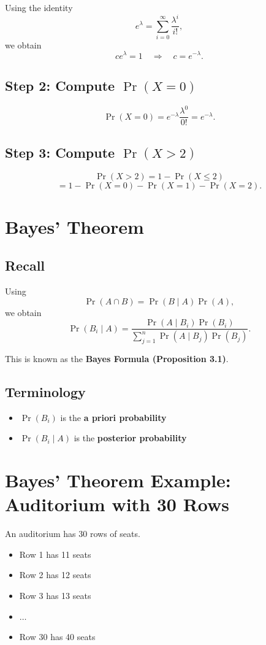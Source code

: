 \documentclass[12pt]{article}
\begin{document}
Using the identity
\[
e^{\lambda} = \sum_{i=0}^{\infty} \frac{\lambda^i}{i!},
\]
we obtain
\[
c e^{\lambda} = 1 \quad \Rightarrow \quad c = e^{-\lambda}.
\]

\subsection*{Step 2: Compute $\Pr(X = 0)$}
\[
\Pr(X = 0) = e^{-\lambda} \frac{\lambda^0}{0!} = e^{-\lambda}.
\]

\subsection*{Step 3: Compute $\Pr(X > 2)$}
\[
\Pr(X > 2) = 1 - \Pr(X \le 2)
\]
\[
= 1 - \Pr(X=0) - \Pr(X=1) - \Pr(X=2).
\]

\section{Bayes’ Theorem}

\subsection{Recall}
Using
\[
\Pr(A \cap B) = \Pr(B \mid A)\Pr(A),
\]
we obtain
\[
\Pr(B_i \mid A) = 
\frac{\Pr(A \mid B_i)\Pr(B_i)}
{\sum_{j=1}^{n} \Pr(A \mid B_j)\Pr(B_j)}.
\]

This is known as the \textbf{Bayes Formula (Proposition 3.1)}.

\subsection{Terminology}
\begin{itemize}
    \item $\Pr(B_i)$ is the \textbf{a priori probability}
    \item $\Pr(B_i \mid A)$ is the \textbf{posterior probability}
\end{itemize}

\section{Bayes’ Theorem Example: Auditorium with 30 Rows}

An auditorium has 30 rows of seats.

\begin{itemize}
    \item Row 1 has 11 seats
    \item Row 2 has 12 seats
    \item Row 3 has 13 seats
    \item $\dots$
    \item Row 30 has 40 seats
\end{itemize}
\end{document}
